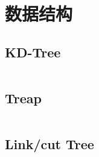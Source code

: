\chapter{数据结构}
\section{KD-Tree}
\inputminted{cpp}{\source/data-structure/kd-tree.cpp}
\section{Treap}
\inputminted{cpp}{\source/data-structure/treap.cpp}
\section{Link/cut Tree}
\inputminted{cpp}{\source/data-structure/link-cut-tree.cpp}
